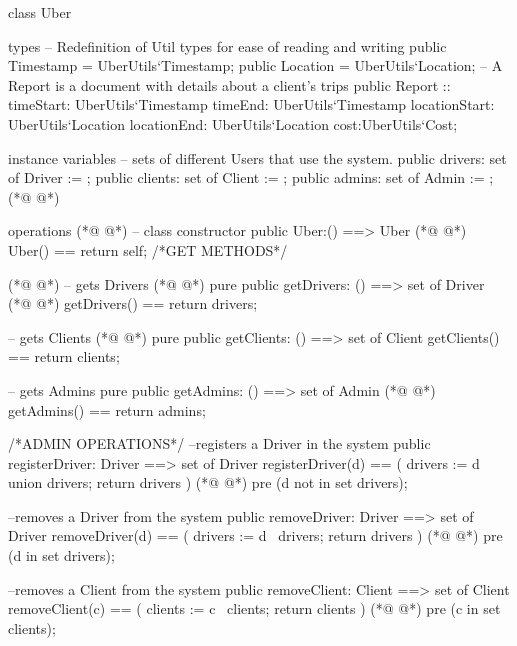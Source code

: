 \begin{vdmpp}[breaklines=true]
class Uber

types
    -- Redefinition of Util types for ease of reading and writing
    public Timestamp = UberUtils`Timestamp;
    public Location = UberUtils`Location;
    -- A Report is a document with details about a client's trips
    public Report :: timeStart: UberUtils`Timestamp
                     timeEnd: UberUtils`Timestamp
                     locationStart: UberUtils`Location
                     locationEnd: UberUtils`Location
                     cost:UberUtils`Cost;

instance variables
    -- sets of different Users that use the system.
    public drivers: set of Driver := {};
    public clients: set of Client := {};
    public admins: set of Admin := {};
(*@
\label{Uber:19}
@*)

operations
(*@
\label{registerDriver:21}
@*)
    -- class constructor
    public Uber:() ==> Uber
(*@
\label{getDrivers:23}
@*)
        Uber() ==
        return self;
  /*GET METHODS*/
  
(*@
\label{getStatus:27}
@*)
  -- gets Drivers
(*@
\label{getClients:28}
@*)
  pure public getDrivers: () ==> set of Driver
(*@
\label{removeDriver:29}
@*)
  getDrivers() == return drivers;
  
  -- gets Clients
(*@
\label{getAdmins:32}
@*)
  pure public getClients: () ==> set of Client
  getClients() == return clients;
  
  -- gets Admins
  pure public getAdmins: () ==> set of Admin
(*@
\label{removeClient:37}
@*)
  getAdmins() == return admins;
  
    /*ADMIN OPERATIONS*/
    --registers a Driver in the system
    public registerDriver: Driver ==> set of Driver
        registerDriver(d) == (
            drivers := {d} union drivers;
            return drivers
        )    
(*@
\label{registerClient:46}
@*)
        pre (d not in set drivers);
    
    --removes a Driver from the system
    public removeDriver: Driver ==> set of Driver
        removeDriver(d) == (
            drivers := {d} \ drivers;
            return drivers
        )    
(*@
\label{requestRide:54}
@*)
        pre (d in set drivers);

    --removes a Client from the system
    public removeClient: Client ==> set of Client
        removeClient(c) == (
            clients := {c} \ clients;
            return clients
        )    
(*@
\label{goOnRide:62}
@*)
        pre (c in set clients);
    

\end{vdmpp}
